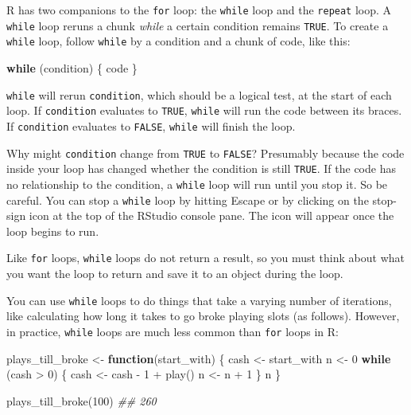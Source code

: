 \documentclass[
  letterpaper,
  DIV=11,
  numbers=noendperiod]{scrbook}
\newenvironment{Shaded}{\begin{snugshade}}{\end{snugshade}}
\newcommand{\ControlFlowTok}[1]{\textcolor[rgb]{0.00,0.23,0.31}{\textbf{#1}}}
\newcommand{\DecValTok}[1]{\textcolor[rgb]{0.68,0.00,0.00}{#1}}
\newcommand{\DocumentationTok}[1]{\textcolor[rgb]{0.37,0.37,0.37}{\textit{#1}}}
\newcommand{\FunctionTok}[1]{\textcolor[rgb]{0.28,0.35,0.67}{#1}}
\newcommand{\NormalTok}[1]{\textcolor[rgb]{0.00,0.23,0.31}{#1}}
\newcommand{\OtherTok}[1]{\textcolor[rgb]{0.00,0.23,0.31}{#1}}
\newcommand{\SpecialCharTok}[1]{\textcolor[rgb]{0.37,0.37,0.37}{#1}}
\begin{document}
R has two companions to the \texttt{for} loop: the \texttt{while} loop
and the \texttt{repeat} loop. A \texttt{while} loop reruns a chunk
\emph{while} a certain condition remains \texttt{TRUE}. To create a
\texttt{while} loop, follow \texttt{while} by a condition and a chunk of
code, like this:

\begin{Shaded}
\begin{Highlighting}[]
\ControlFlowTok{while}\NormalTok{ (condition) \{}
\NormalTok{  code}
\NormalTok{\}}
\end{Highlighting}
\end{Shaded}

\texttt{while} will rerun \texttt{condition}, which should be a logical
test, at the start of each loop. If \texttt{condition} evaluates to
\texttt{TRUE}, \texttt{while} will run the code between its braces. If
\texttt{condition} evaluates to \texttt{FALSE}, \texttt{while} will
finish the loop.

Why might \texttt{condition} change from \texttt{TRUE} to
\texttt{FALSE}? Presumably because the code inside your loop has changed
whether the condition is still \texttt{TRUE}. If the code has no
relationship to the condition, a \texttt{while} loop will run until you
stop it. So be careful. You can stop a \texttt{while} loop by hitting
Escape or by clicking on the stop-sign icon at the top of the RStudio
console pane. The icon will appear once the loop begins to run.

Like \texttt{for} loops, \texttt{while} loops do not return a result, so
you must think about what you want the loop to return and save it to an
object during the loop.

You can use \texttt{while} loops to do things that take a varying number
of iterations, like calculating how long it takes to go broke playing
slots (as follows). However, in practice, \texttt{while} loops are much
less common than \texttt{for} loops in R:

\begin{Shaded}
\begin{Highlighting}[]
\NormalTok{plays\_till\_broke }\OtherTok{\textless{}{-}} \ControlFlowTok{function}\NormalTok{(start\_with) \{}
\NormalTok{  cash }\OtherTok{\textless{}{-}}\NormalTok{ start\_with}
\NormalTok{  n }\OtherTok{\textless{}{-}} \DecValTok{0}
  \ControlFlowTok{while}\NormalTok{ (cash }\SpecialCharTok{\textgreater{}} \DecValTok{0}\NormalTok{) \{}
\NormalTok{    cash }\OtherTok{\textless{}{-}}\NormalTok{ cash }\SpecialCharTok{{-}} \DecValTok{1} \SpecialCharTok{+} \FunctionTok{play}\NormalTok{()}
\NormalTok{    n }\OtherTok{\textless{}{-}}\NormalTok{ n }\SpecialCharTok{+} \DecValTok{1}
\NormalTok{  \}}
\NormalTok{  n}
\NormalTok{\}}

\FunctionTok{plays\_till\_broke}\NormalTok{(}\DecValTok{100}\NormalTok{)}
\DocumentationTok{\#\# 260}
\end{Highlighting}
\end{Shaded}
\end{document}
